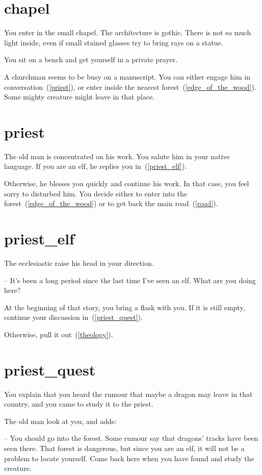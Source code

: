 \section{chapel}

You enter in the small chapel. The architecture is gothic. There is not so much
light inside, even if small stained glasses try to bring rays on a statue.

You sit on a bench and get yourself in a private prayer.

A churchman seems to be busy on a manuscript. You can either engage him in
conversation~(\ref{priest}), or enter inside the nearest
forest~(\ref{edge_of_the_wood}). Some mighty creature might leave in that place.

\section{priest}

The old man is concentrated on his work. You salute him in your native language.
If you are an elf, he replies you in~(\ref{priest_elf}).

Otherwise, he blesses you quickly and continue his work. In that case, you feel
sorry to disturbed him. You decide either to enter into the
forest~(\ref{edge_of_the_wood}) or to get back the main road~(\ref{road}).

\section{priest_elf}

The ecclesiastic raise his head in your direction.

-- It's been a long period since the last time I've seen an elf. What are you
doing here?

At the beginning of that story, you bring a flask with you. If it is still
empty, continue your discussion in~(\ref{priest_quest}).

Otherwise, pull it
out~(\ref{theology}).

\section{priest_quest}

You explain that you heard the rumour that maybe a dragon may leave in that
country, and you came to study it to the priest.

The old man look at you, and adds:

-- You should go into the forest. Some rumour say that dragons' tracks have been
seen there. That forest is dangerous, but since you are an elf, it will not be a
problem to locate yourself. Come back here when you have found and study the
creature.

